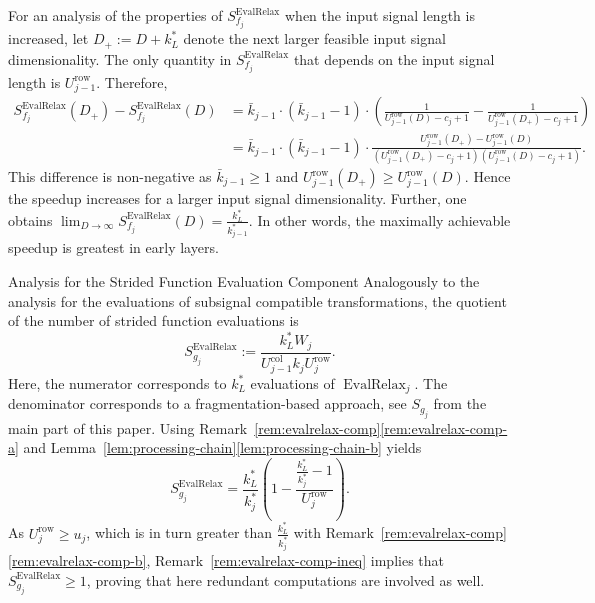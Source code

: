 \documentclass[journal]{IEEEtran}
\makeatletter
\def\subsubsection{\@startsection{subsubsection} {3} {\z@} {1.5ex plus 1.5ex minus 0.5ex} {0.7ex plus .5ex minus 0ex} {\normalfont\normalsize\itshape}}
\newcommand{\row}{\operatorname{row}}
\newcommand{\col}{\operatorname{col}}
\DeclareMathOperator{\EvalRelax}{EvalRelax}
\makeatother
\begin{document}
For an analysis of the properties of $S_{f_j}^{\EvalRelax}$ when the input signal length is increased, let $D_+ := D + k_L^*$ denote the next larger feasible input signal dimensionality.
The only quantity in $S_{f_j}^{\EvalRelax}$ that depends on the input signal length is $U_{j - 1}^{\row}$.
Therefore,
\begin{align*}
  S_{f_j}^{\EvalRelax}(D_+) - S_{f_j}^{\EvalRelax}(D)
  &= \bar{k}_{j - 1}\cdot(\bar{k}_{j - 1} - 1)\cdot\left(\frac{1}{U_{j - 1}^{\row}(D) - c_j + 1} - \frac{1}{U_{j - 1}^{\row}(D_+) - c_j + 1}\right)\\
  &= \bar{k}_{j - 1}\cdot(\bar{k}_{j - 1} - 1)\cdot\frac{U_{j - 1}^{\row}(D_+) - U_{j - 1}^{\row}(D)}{(U_{j - 1}^{\row}(D_+) - c_j + 1) (U_{j - 1}^{\row}(D) - c_j + 1)}\text{.}
\end{align*}
This difference is non-negative as $\bar{k}_{j - 1}\geq 1$ and $U_{j - 1}^{\row}(D_+) \geq U_{j - 1}^{\row}(D)$.
Hence the speedup increases for a larger input signal dimensionality.
Further, one obtains $\lim_{D\to\infty} S_{f_j}^{\EvalRelax}(D) = \frac{k_L^*}{k_{j - 1}^*}$.
In other words, the maximally achievable speedup is greatest in early layers.

\subsubsection{Analysis for the Strided Function Evaluation Component}
Analogously to the analysis for the evaluations of subsignal compatible transformations, the quotient of the number of strided function evaluations is
\begin{displaymath}
  S_{g_j}^{\EvalRelax} := \frac{k_L^* W_j}{U_{j - 1}^{\col}k_j U_j^{\row}}\text{.}
\end{displaymath}
Here, the numerator corresponds to $k_L^*$ evaluations of $\EvalRelax_j$.
The denominator corresponds to a fragmentation-based approach, see $S_{g_j}$ from the main part of this paper.
Using Remark~\ref{rem:evalrelax-comp}\ref{rem:evalrelax-comp-a} and Lemma~\ref{lem:processing-chain}\ref{lem:processing-chain-b} yields
\begin{displaymath}
  S_{g_j}^{\EvalRelax} = \frac{k_L^*}{k_j^*}\left(1 - \frac{\tfrac{k_L^*}{k_j^*} - 1}{U_j^{\row}}\right)\text{.}
\end{displaymath}
As $U_j^{\row} \geq u_j$, which is in turn greater than $\frac{k_L^*}{k_j^*}$ with Remark~\ref{rem:evalrelax-comp}\ref{rem:evalrelax-comp-b}, Remark~\ref{rem:evalrelax-comp-ineq} implies that $S_{g_j}^{\EvalRelax} \geq 1$, proving that here redundant computations are involved as well.
\end{document}
